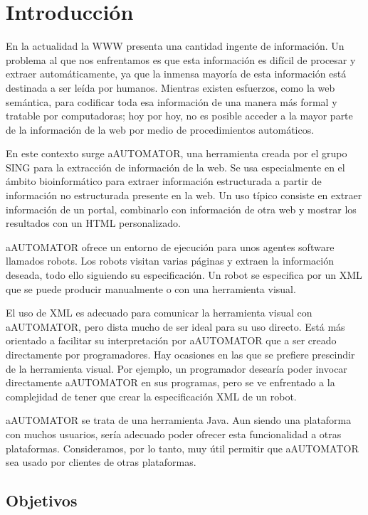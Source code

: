 \section{Introducción}
En la actualidad la WWW presenta una cantidad ingente de
información. Un problema al que nos enfrentamos es que esta
información es difícil de procesar y extraer automáticamente, ya que
la inmensa mayoría de esta información está destinada a ser leída por
humanos. Mientras existen esfuerzos, como la web semántica, para
codificar toda esa información de una manera más formal y tratable por
computadoras; hoy por hoy, no es posible acceder a la mayor parte de
la información de la web por medio de procedimientos automáticos.

En este contexto surge aAUTOMATOR\cite{aAUTOMATOR}, una herramienta
creada por el grupo SING para la extracción de información de la
web. Se usa especialmente en el ámbito bioinformático para extraer
información estructurada a partir de información no estructurada
presente en la web. Un uso típico consiste en extraer información de
un portal, combinarlo con información de otra web y mostrar los
resultados con un HTML personalizado.

aAUTOMATOR ofrece un entorno de ejecución para unos
agentes software llamados robots. Los robots visitan varias páginas y
extraen la información deseada, todo ello siguiendo su
especificación. Un robot se especifica por un XML que se puede
producir manualmente o con una herramienta visual.

El uso de XML es adecuado para comunicar la herramienta visual con
aAUTOMATOR, pero dista mucho de ser ideal para su uso directo. Está
más orientado a facilitar su interpretación por aAUTOMATOR que a ser
creado directamente por programadores. Hay ocasiones en las que se
prefiere prescindir de la herramienta visual. Por ejemplo, un
programador desearía poder invocar directamente aAUTOMATOR en sus
programas, pero se ve enfrentado a la complejidad de tener que crear
la especificación XML de un robot.

aAUTOMATOR se trata de una herramienta Java. Aun siendo una plataforma
con muchos usuarios, sería adecuado poder ofrecer esta funcionalidad a
otras plataformas. Consideramos, por lo tanto, muy útil permitir que
aAUTOMATOR sea usado por clientes de otras plataformas.

\subsection{Objetivos}

